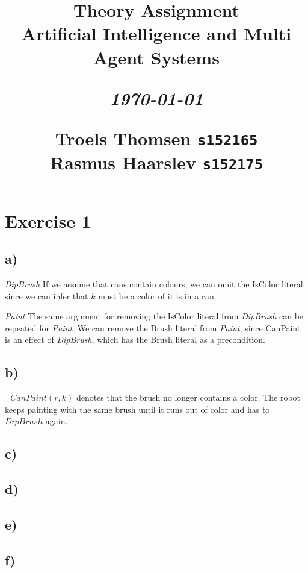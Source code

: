 \documentclass[12pt]{article}
\title{
  \vspace{4cm}
  \begin{flushleft}
  \Large{\textbf{Theory Assignment}} \\
  \large{Artificial Intelligence and Multi Agent Systems}
  \end{flushleft}
  \vspace{0cm}
  \begin{flushleft}
  \small
  \textit{\today}
  \end{flushleft}
  \vspace{12cm}
  \begin{flushleft}
  \small
  Troels Thomsen \texttt{s152165} \\
  Rasmus Haarslev \texttt{s152175} \\
  \end{flushleft}
}
\date{
}
\begin{document}
\clearpage
{}
\thispagestyle{empty}
\maketitle

\newpage

\section*{Exercise 1}

\subsection*{a)}
\label{sub:a)}

\textit{DipBrush} If we assume that cans contain colours, we can omit the IsColor literal since we can infer that $k$ must be a color of it is in a can.

\textit{Paint} The same argument for removing the IsColor literal from \textit{DipBrush} can be repeated for \textit{Paint}. We can remove the Brush literal from \textit{Paint}, since CanPaint is an effect of \textit{DipBrush}, which has the Brush literal as a precondition.

\subsection*{b)}
\label{sub:b)}

$\neg CanPaint(r, k)$ denotes that the brush no longer contains a color. The robot keeps painting with the same brush until it runs out of color and has to $DipBrush$ again.

\subsection*{c)}
\label{sub:c)}

\subsection*{d)}
\label{sub:d)}

\subsection*{e)}
\label{sub:e)}

\subsection*{f)}
\label{sub:f)}
\end{document}
